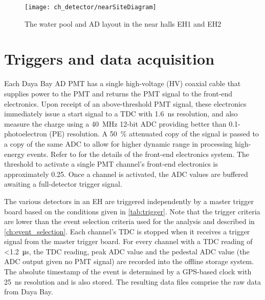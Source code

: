 \begin{figure}
    \centering
    \texttt{[image: ch\_detector/nearSiteDiagram]}
    \caption{The water pool and AD layout in the near halls EH1 and EH2}
    \label{fig:wpcutout}
\end{figure}



\section{Triggers and data acquisition}
\label{sec:daq}

Each Daya Bay AD PMT has a single high-voltage (HV) coaxial cable
that supplies power to the PMT and returns the PMT signal to the
front-end electronics.
Upon receipt of an above-threshold PMT signal, these electronics immediately
issue a start signal to a TDC with \SI{1.6}{\ns} resolution,
and also measure the charge using a \SI{40}{\MHz} \num{12}-bit ADC
providing better than \num{0.1}-photoelectron (PE) resolution.
A \SI{50}{\percent} attenuated copy of the signal is passed to a copy
of the same ADC to allow for higher dynamic range in processing high-energy
events.
Refer to \cite[Sec.~II]{ngd2016} for the details
of the front-end electronics system.
The threshold to activate a single PMT channel's front-end electronics
is approximately \SI{0.25}{\pe}.
Once a channel is activated, the ADC values are buffered
awaiting a full-detector trigger signal.

The various detectors in an EH are triggered independently
by a master trigger board based on the conditions given in \cref{tab:trigger}.
Note that the trigger criteria are lower than the event selection
criteria used for the \thetaot{} analysis and described in \cref{ch:event_selection}.
Each channel's TDC is stopped when it receives a trigger signal
from the master trigger board.
For every channel with a TDC reading of \SI{<1.2}{\us},
the TDC reading, peak ADC value and the pedestal ADC value
(the ADC output given no PMT signal)
are recorded into the offline storage system.
The absolute timestamp of the event is determined by a GPS-based clock
with \SI{25}{\ns} resolution and is also stored.
The resulting data files comprise the raw data from Daya Bay.


